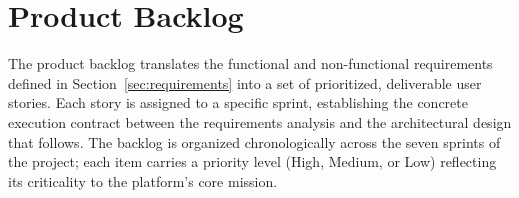 \documentclass[12pt,a4paper]{report}
\begin{document}
\section{Product Backlog}

The product backlog translates the functional and non-functional requirements
defined in Section~\ref{sec:requirements} into a set of prioritized,
deliverable user stories. Each story is assigned to a specific sprint,
establishing the concrete execution contract between the requirements
analysis and the architectural design that follows. The backlog is organized
chronologically across the seven sprints of the project; each item carries
a priority level (High, Medium, or Low) reflecting its criticality to the
platform's core mission.
\end{document}
